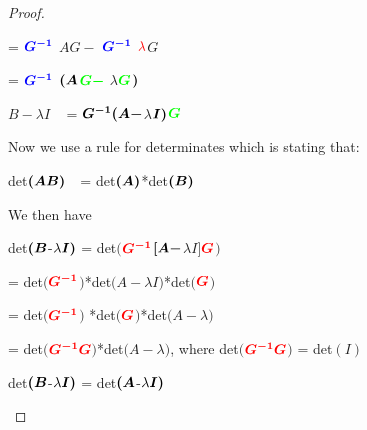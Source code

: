 \documentclass[a4paper]{article}
\begin{document}
\begin{appendix}
\begin{proof}
\begin{adjustwidth}{20pt}{0pt}
\quad\quad\quad\quad\quad  =
$\mathbin{\textcolor{blue}{\mbox{\boldmath$G^{-1}$} }}$
 \mbox{\boldmath$AG - $}
$\mathbin{\textcolor{blue}{\mbox{\boldmath$G^{-1}$} }}$
$\mathbin{\textcolor{red}{\lambda}}$\mbox{\boldmath$G$}

\quad\quad\quad\quad\quad=
$\mathbin{\textcolor{blue}{\mbox{\boldmath$G^{-1}$} }}$
$\mbox{\boldmath$(A$}$$\mathbin{\textcolor{green}{\mbox{\boldmath$G - $} }}$
$\lambda$$\mathbin{\textcolor{green}{\mbox{\boldmath$G$} }}$$\mbox{\boldmath$)$}$

\mbox{\boldmath$B-$}$\lambda$\mbox{\boldmath$I$} \,\,\,\,\,\quad=
$\mbox{\boldmath$G^{-1}(A - $}$$\lambda$$\mbox{\boldmath$I)$}$$\mathbin{\textcolor{green}{\mbox{\boldmath$G$} }}$
\end{adjustwidth}

Now we use a rule for determinates which is stating that:
\begin{adjustwidth}{20pt}{50pt}
\footnotesize
det$\mbox{\boldmath$(AB)$}$\,\,\,\, = det$\mbox{\boldmath$(A)$}$*det$\mbox{\boldmath$(B)$}$
\end{adjustwidth}
We then have
\begin{adjustwidth}{20pt}{50pt}
\footnotesize

det$\mbox{\boldmath$(B$}$-$\lambda\mbox{\boldmath$I)$}$ = det\mbox{\boldmath$($}$\mathbin{\textcolor{red}{\mbox{\boldmath$G^{-1}$} }}$$\mbox{\boldmath$[A-$}$$\lambda$\mbox{\boldmath$I]$}$\mathbin{\textcolor{red}{\mbox{\boldmath$G$} }}$\mbox{\boldmath$)$}


\quad\quad\quad\quad\quad=
det\mbox{\boldmath$($}$\mathbin{\textcolor{red}{\mbox{\boldmath$G^{-1}$} }}$\mbox{\boldmath$)$}*det\mbox{\boldmath$(A - $}$\lambda$\mbox{\boldmath$I)$}*det\mbox{\boldmath$($}$\mathbin{\textcolor{red}{\mbox{\boldmath$G$} }}$\mbox{\boldmath$)$}


\quad\quad\quad\quad\quad= 
det\mbox{\boldmath$($}$\mathbin{\textcolor{red}{\mbox{\boldmath$G^{-1}$} }}$\mbox{\boldmath$)$}
*det\mbox{\boldmath$($}$\mathbin{\textcolor{red}{\mbox{\boldmath$G$} }}$\mbox{\boldmath$)$}*det\mbox{\boldmath$(A-$}$\lambda$\mbox{\boldmath$)$}



\quad\quad\quad\quad\quad=
det\mbox{\boldmath$($}$\mathbin{\textcolor{red}{\mbox{\boldmath$G^{-1}G$} }}$\mbox{\boldmath$)$}*det\mbox{\boldmath$(A-$}$\lambda$\mbox{\boldmath$)$}, \quad\quad where det\mbox{\boldmath$($}$\mathbin{\textcolor{red}{\mbox{\boldmath$G^{-1}G$} }}$\mbox{\boldmath$)$} = det\mbox{\boldmath$(I)$}

det$\mbox{\boldmath$(B$}$-$\lambda\mbox{\boldmath$I)$}$ = 
det$\mbox{\boldmath$(A$}$-$\lambda\mbox{\boldmath$I)$}$ 
\end{adjustwidth}
\end{proof}



\end{appendix}
\end{document}
